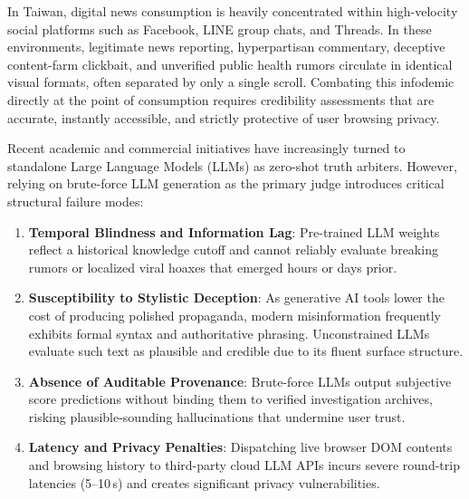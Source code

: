 \documentclass[twoside]{llncs}
\begin{document}
In Taiwan, digital news consumption is heavily concentrated within high-velocity social platforms such as Facebook, LINE group chats, and Threads. In these environments, legitimate news reporting, hyperpartisan commentary, deceptive content-farm clickbait, and unverified public health rumors circulate in identical visual formats, often separated by only a single scroll. Combating this infodemic directly at the point of consumption requires credibility assessments that are accurate, instantly accessible, and strictly protective of user browsing privacy.

Recent academic and commercial initiatives have increasingly turned to standalone Large Language Models (LLMs) as zero-shot truth arbiters. However, relying on brute-force LLM generation as the primary judge introduces critical structural failure modes:
\begin{enumerate}
  \item \textbf{Temporal Blindness and Information Lag}: Pre-trained LLM weights reflect a historical knowledge cutoff and cannot reliably evaluate breaking rumors or localized viral hoaxes that emerged hours or days prior.
  \item \textbf{Susceptibility to Stylistic Deception}: As generative AI tools lower the cost of producing polished propaganda, modern misinformation frequently exhibits formal syntax and authoritative phrasing. Unconstrained LLMs evaluate such text as plausible and credible due to its fluent surface structure.
  \item \textbf{Absence of Auditable Provenance}: Brute-force LLMs output subjective score predictions without binding them to verified investigation archives, risking plausible-sounding hallucinations that undermine user trust.
  \item \textbf{Latency and Privacy Penalties}: Dispatching live browser DOM contents and browsing history to third-party cloud LLM APIs incurs severe round-trip latencies (5--10\,s) and creates significant privacy vulnerabilities.
\end{enumerate}
\end{document}

